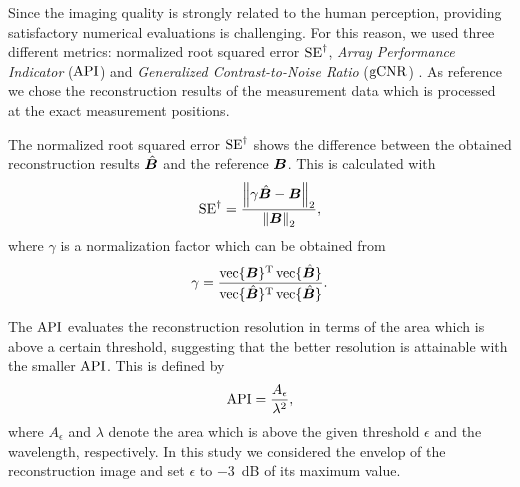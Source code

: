 Since the imaging quality is strongly related to the human perception, providing satisfactory numerical evaluations is challenging. For this reason, we used three different metrics: normalized root squared error $\operatorname{SE}^{\dagger}$, \textit{Array Performance Indicator} ($\operatorname{API}$) \cite{Holmes05API} and \textit{Generalized Contrast-to-Noise Ratio} ($\operatorname{gCNR}$) \cite{Molares19GCNR}. As reference we chose the reconstruction results of the measurement data which is processed at the exact measurement positions. \par

The normalized root squared error $\operatorname{SE}^{\dagger}$ shows the difference between the obtained reconstruction results $\hat{\bm{B}}$ and the reference $\bm{B}$. This is calculated with
\begin{equation} \label{eq:SEdag}
	\SEdag = \frac{\norm{\gamma \Recohat - \Reco}_2}{\norm{\Reco}_2},
\end{equation}
where $\gamma$ is a normalization factor which can be obtained from 
\begin{equation}
	\gamma = \frac{\operatorname{vec} \{ \bm{B} \}^{\operatorname{T}} \operatorname{vec} \{ \hat{\bm{B}} \}}{\operatorname{vec} \{ \hat{\bm{B}} \}^{\operatorname{T}} \operatorname{vec} \{ \hat{\bm{B}} \}}.
\end{equation} \par

The $\operatorname{API}$ evaluates the reconstruction resolution in terms of the area which is above a certain threshold, suggesting that the better resolution is attainable with the smaller $\operatorname{API}$. This is defined by \cite{Holmes05API}
\begin{equation} \label{eq:API}
	\API = \frac{A_{\epsilon}}{\lambda^{2}},
\end{equation}
where $A_{\epsilon}$ and $\lambda$ denote the area which is above the given threshold $\epsilon$ and the wavelength, respectively. In this study we considered the envelop of the reconstruction image and set $\epsilon$ to \SI{-3}{\deci \bel} of its maximum value. \par

